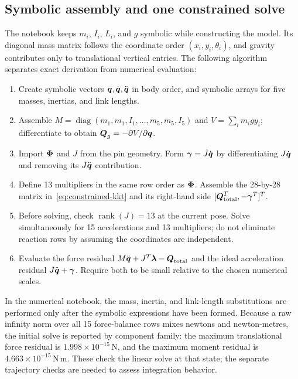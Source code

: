 \documentclass[../main.tex]{subfiles}
\begin{document}
\subsection{Symbolic assembly and one constrained solve}

The notebook keeps $m_i$, $I_i$, $L_i$, and $g$ symbolic while constructing the model. Its diagonal mass matrix follows the coordinate order $(x_i,y_i,\theta_i)$, and gravity contributes only to translational vertical entries. The following algorithm separates exact derivation from numerical evaluation:
\begin{enumerate}
\item Create symbolic vectors $\boldsymbol{q},\dot{\boldsymbol{q}},\ddot{\boldsymbol{q}}$ in body order, and symbolic arrays for five masses, inertias, and link lengths.
\item Assemble $M=\operatorname{diag}(m_1,m_1,I_1,\ldots,m_5,m_5,I_5)$ and $V=\sum_i m_i g y_i$; differentiate to obtain $\boldsymbol{Q}_g=-\partial V/\partial\boldsymbol{q}$.
\item Import $\boldsymbol{\Phi}$ and $J$ from the pin geometry. Form $\boldsymbol{\gamma}=\dot J\dot{\boldsymbol{q}}$ by differentiating $J\dot{\boldsymbol{q}}$ and removing its $J\ddot{\boldsymbol{q}}$ contribution.
\item Define 13 multipliers in the same row order as $\boldsymbol{\Phi}$. Assemble the 28-by-28 matrix in~\eqref{eq:constrained-kkt} and its right-hand side $[\boldsymbol{Q}_{\mathrm{total}}^T,-\boldsymbol{\gamma}^T]^T$.
\item Before solving, check $\operatorname{rank}(J)=13$ at the current pose. Solve simultaneously for 15 accelerations and 13 multipliers; do not eliminate reaction rows by assuming the coordinates are independent.
\item Evaluate the force residual $M\ddot{\boldsymbol{q}}+J^T\boldsymbol{\lambda}-\boldsymbol{Q}_{\mathrm{total}}$ and the ideal acceleration residual $J\ddot{\boldsymbol{q}}+\boldsymbol{\gamma}$. Require both to be small relative to the chosen numerical scales.
\end{enumerate}
In the numerical notebook, the mass, inertia, and link-length substitutions are performed only after the symbolic expressions have been formed. Because a raw infinity norm over all 15 force-balance rows mixes newtons and newton-metres, the initial solve is reported by component family: the maximum translational force residual is $1.998\times10^{-15}\,\mathrm N$, and the maximum moment residual is $4.663\times10^{-15}\,\mathrm{N\,m}$. These check the linear solve at that state; the separate trajectory checks are needed to assess integration behavior.
\end{document}
